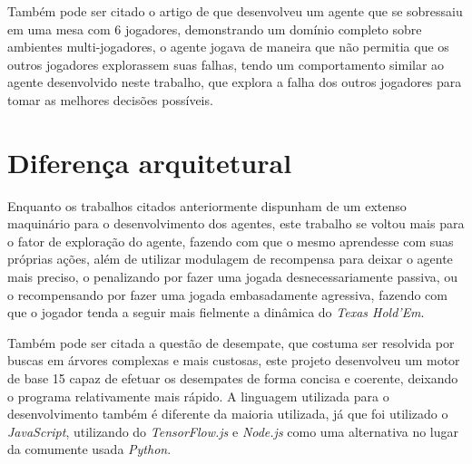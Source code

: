 Também pode ser citado o artigo de  que desenvolveu um agente que se sobressaiu em uma mesa com 6 jogadores, demonstrando um domínio completo sobre ambientes multi-jogadores, o agente jogava de maneira que não permitia que os outros jogadores explorassem suas falhas, tendo um comportamento similar ao agente desenvolvido neste trabalho, que explora a falha dos outros jogadores para tomar as melhores decisões possíveis.

\section{Diferença arquitetural}

Enquanto os trabalhos citados anteriormente dispunham de um extenso maquinário para o desenvolvimento dos agentes, este trabalho se voltou mais para o fator de exploração do agente, fazendo com que o mesmo aprendesse com suas próprias ações, além de utilizar modulagem de recompensa para deixar o agente mais preciso, o penalizando por fazer uma jogada desnecessariamente passiva, ou o recompensando por fazer uma jogada embasadamente agressiva, fazendo com que o jogador tenda a seguir mais fielmente a dinâmica do \textit{Texas Hold'Em}.

Também pode ser citada a questão de desempate, que costuma ser resolvida por buscas em árvores complexas e mais custosas, este projeto desenvolveu um motor de base 15 capaz de efetuar os desempates de forma concisa e coerente, deixando o programa relativamente mais rápido. A linguagem utilizada para o desenvolvimento também é diferente da maioria utilizada, já que foi utilizado o \textit{JavaScript}, utilizando do \textit{TensorFlow.js} e \textit{Node.js} como uma alternativa no lugar da comumente usada \textit{Python}.

